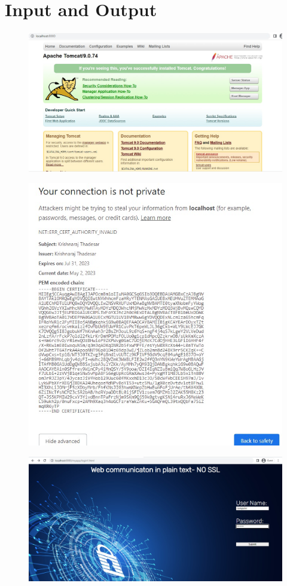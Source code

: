 \documentclass[11pt]{article}
\begin{document}
\section{Input and Output}
\begin{figure}[H]
    \centering
    \includegraphics[width=.95\textwidth]{tomcat.jpeg}
    \caption{}
\end{figure}
\begin{figure}[H]
    \centering
    \includegraphics[width=.95\textwidth]{tomcat1.jpeg}
    \caption{}
\end{figure}
\begin{figure}[H]
    \centering
    \includegraphics[width=.95\textwidth]{tomcat2.jpeg}
    \caption{}
\end{figure}
\end{document}
